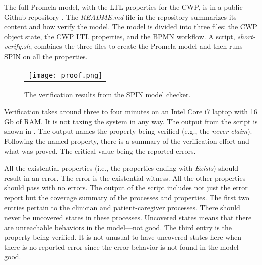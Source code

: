 The full Promela model, with the LTL properties for the CWP, is in a public Github repository \cite{repo}. The \emph{README.md} file in the repository summarizes its content and how verify the model. The model is divided into three files: the CWP object state, the CWP LTL properties, and the BPMN workflow. A script, \emph{short-verify.sh}, combines the three files to create the Promela model and then runs SPIN on all the properties.

\begin{figure}
  \begin{center}
    \begin{tabular}{c}
      \texttt{[image: proof.png]}
    \end{tabular}
  \end{center}
\caption{The verification results from the SPIN model checker.}
\label{fig:proof}
\end{figure}

Verification takes around three to four minutes on an Intel Core i7 laptop with 16 Gb of RAM. It is not taxing the system in any way. The output from the script is shown in . The output names the property being verified (e.g., the \emph{never claim}). Following the named property, there is a  summary of the verification effort and what was proved. The critical value being the reported errors.

All the existential properties (i.e., the properties ending with \emph{Exists}) should result in an error. The error is the existential witness. All the other properties should pass with no errors. The output of the script includes not just the error report but the coverage summary of the processes and properties. The first two entries pertain to the clinician and patient-caregiver processes. There should never be uncovered states in these processes. Uncovered states means that there are unreachable behaviors in the model---not good. The third entry is the property being verified. It is not unusual to have uncovered states here when there is no reported error since the error behavior is not found in the model---good.